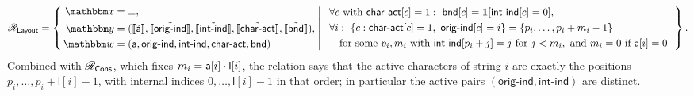 \begin{displaymath}
\NPRelation_{\mathsf{Layout}} = \left\{\,
  \begin{aligned}
    \NPInstance &= \bot,\\
    \NPInstancey &= (\Oracle{\MLE{\mathsf{a}}}, \Oracle{\MLE{\mathsf{orig\text{-}ind}}}, \Oracle{\MLE{\mathsf{int\text{-}ind}}}, \Oracle{\MLE{\mathsf{char\text{-}act}}}, \Oracle{\MLE{\mathsf{bnd}}}),\\
    \NPWitness &= (\mathsf{a}, \mathsf{orig\text{-}ind}, \mathsf{int\text{-}ind}, \mathsf{char\text{-}act}, \mathsf{bnd})
  \end{aligned}
  \;\middle|\;
  \begin{array}{l}
    \forall c\ \text{with}\ \mathsf{char\text{-}act}[c] = 1:\ \mathsf{bnd}[c] = \mathbf{1}[\mathsf{int\text{-}ind}[c] = 0], \\[3pt]
    \forall i:\ \{c : \mathsf{char\text{-}act}[c] = 1,\ \mathsf{orig\text{-}ind}[c] = i\} = \{p_i, \dots, p_i + m_i - 1\} \\[3pt]
    \quad \text{for some } p_i, m_i \text{ with } \mathsf{int\text{-}ind}[p_i + j] = j \text{ for } j < m_i,\ \text{and } m_i = 0 \text{ if } \mathsf{a}[i] = 0
  \end{array}
\,\right\}.
\end{displaymath}
\fi
Combined with $\mathscr{R}_{\mathsf{Cons}}$, which fixes $m_i = \mathsf{a}[i]\cdot\mathsf{l}[i]$, the relation says that the active characters of string $i$ are exactly the positions $p_i, \dots, p_i + \mathsf{l}[i] - 1$, with internal indices $0, \dots, \mathsf{l}[i]-1$ in that order; in particular the active pairs $(\mathsf{orig\text{-}ind}, \mathsf{int\text{-}ind})$ are distinct.
